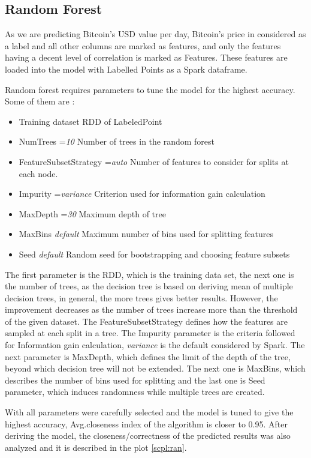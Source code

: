 \documentclass[sigconf]{acmart}
\begin{document}
\subsection{Random Forest}
As we are predicting Bitcoin's USD value per day, Bitcoin's price in considered as a label and all other columns are marked as features, and only the features having a decent level of correlation is marked as Features. These features are loaded into the model with Labelled Points as a Spark dataframe.

Random forest requires parameters to tune the model for the highest accuracy. 
Some of them are :
\begin{itemize}
\item Training dataset RDD of LabeledPoint
\item NumTrees ={\em 10}   Number of trees in the random forest
\item FeatureSubsetStrategy ={\em auto}   Number of features to consider for splits at each node.
\item Impurity ={\em variance }  Criterion used for information gain calculation 
\item MaxDepth ={\em 30 }  Maximum depth of tree
\item MaxBins {\em default }   Maximum number of bins used for splitting features
\item Seed {\em default }   Random seed for bootstrapping and choosing feature subsets
\end{itemize}

The first parameter is the RDD, which is the training data set, the next one is the number of trees, as the decision tree is based on deriving mean of multiple decision trees, in general, the more trees gives better results. However, the improvement decreases as the number of trees increase more than the threshold of the given dataset. The FeatureSubsetStrategy defines how the features are sampled at each split in a tree. The Impurity parameter is the criteria followed for Information gain calculation, {\em variance} is the default considered by Spark. The next parameter is MaxDepth, which defines the limit of the depth of the tree, beyond which decision tree will not be extended. The next one is MaxBins, which describes the number of bins used for splitting and the last one is Seed parameter, which induces randomness while multiple trees are created.  

With all parameters were carefully selected and the model is tuned to give the highest accuracy, Avg.closeness index of the algorithm is closer to 0.95. After deriving the model, the closeness/correctness of the predicted results was also analyzed and it is described in the plot \ref{scpl:ran}.
\end{document}
